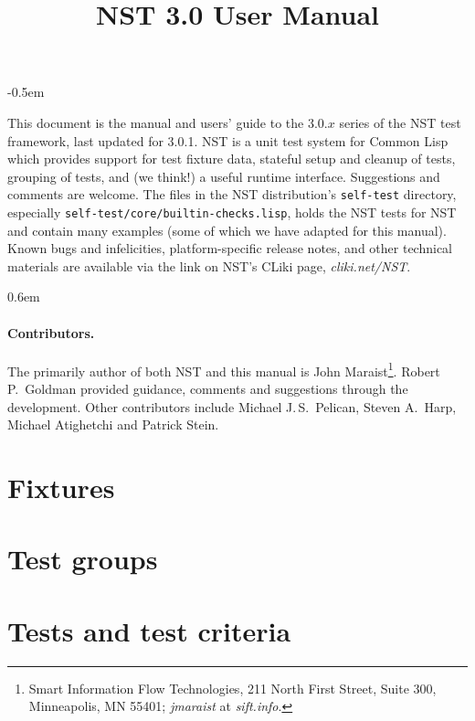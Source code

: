 \documentclass{article}
\title{NST 3.0 User Manual}
\begin{document}
\maketitle
\thispagestyle{empty}
\parskip -0.5em

\noindent This document is the manual and users' guide to the 3.0.$x$
series of the NST test framework, last updated for 3.0.1.  NST is a
unit test system for Common Lisp which provides support for test
fixture data, stateful setup and cleanup of tests, grouping of tests,
and (we think!) a useful runtime interface.  Suggestions and comments
are welcome.  The files in the NST distribution's \texttt{self-test}
directory, especially \texttt{self-test/core/builtin-checks.lisp},
holds the NST tests for NST and contain many examples (some of which
we have adapted for this manual).  Known bugs and infelicities,
platform-specific release notes, and other technical materials are
available via the link on NST's CLiki page,
\textsl{cliki.net/NST}\enspace.

\tableofcontents
\parskip 0.6em
\parindent 0pt

\paragraph{Contributors.}
The primarily author of both NST and this manual is John
Maraist\footnote{Smart Information Flow Technologies, 211 North First
  Street, Suite 300, Minneapolis, MN 55401; \textsl{jmaraist} at
  \textsl{sift.info}.}.  Robert P.\ Goldman provided guidance,
comments and suggestions through the development.  Other contributors
include Michael J.\,S.\ Pelican, Steven A.\ Harp, Michael
Atighetchi and Patrick Stein.  \cleardoublepage
{}

\section{Fixtures}
\label{fixtures}



\section{Test groups}
\label{sec:groups}


\section{Tests and test criteria}
\label{sec:deftest}

\end{document}
